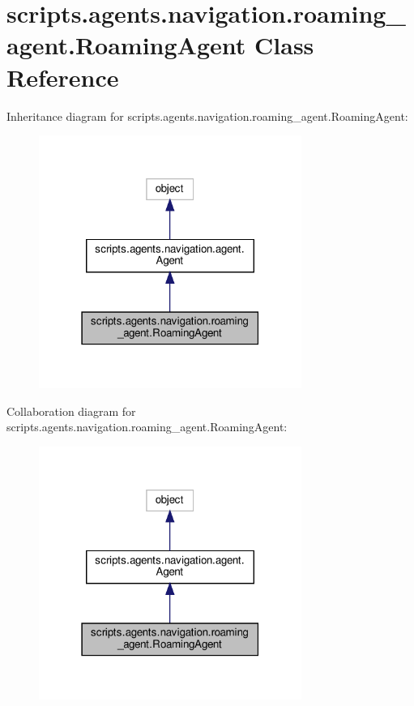 \hypertarget{classscripts_1_1agents_1_1navigation_1_1roaming__agent_1_1RoamingAgent}{}\section{scripts.\+agents.\+navigation.\+roaming\+\_\+agent.\+Roaming\+Agent Class Reference}
\label{classscripts_1_1agents_1_1navigation_1_1roaming__agent_1_1RoamingAgent}


Inheritance diagram for scripts.\+agents.\+navigation.\+roaming\+\_\+agent.\+Roaming\+Agent\+:\nopagebreak
\begin{figure}[H]
\begin{center}
\leavevmode
\includegraphics[width=243pt]{d2/d14/classscripts_1_1agents_1_1navigation_1_1roaming__agent_1_1RoamingAgent__inherit__graph}
\end{center}
\end{figure}


Collaboration diagram for scripts.\+agents.\+navigation.\+roaming\+\_\+agent.\+Roaming\+Agent\+:\nopagebreak
\begin{figure}[H]
\begin{center}
\leavevmode
\includegraphics[width=243pt]{d9/dc7/classscripts_1_1agents_1_1navigation_1_1roaming__agent_1_1RoamingAgent__coll__graph}
\end{center}
\end{figure}
